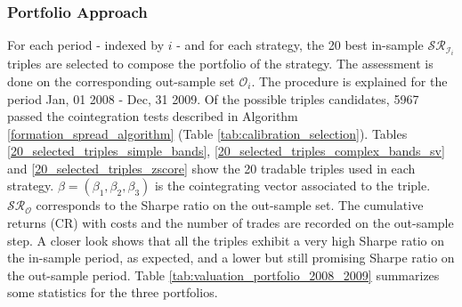 \documentclass[11pt,a4,twosided,singlespacing,titlepagenumber=on]{scrreprt}
\numberwithin{equation}{chapter} %
\theoremstyle{remark}
\begin{document}
\subsubsection{Portfolio Approach}
For each period - indexed by $i$ - and for each strategy, the 20 best in-sample $\mathcal{SR}_{\mathcal{I}_i}$ triples are selected to compose the portfolio of the strategy. The assessment is done on the corresponding out-sample set $\mathcal{O}_i$. The procedure is explained for the period Jan, 01 2008 - Dec, 31 2009. Of the possible triples candidates, 5967 passed the cointegration tests described in Algorithm \ref{formation_spread_algorithm} (Table \ref{tab:calibration_selection}). Tables \ref{20_selected_triples_simple_bands}, \ref{20_selected_triples_complex_bands_sv} and \ref{20_selected_triples_zscore} show the 20 tradable triples used in each strategy. $\beta = (\beta_1, \beta_2, \beta_3)$ is the cointegrating vector associated to the triple. $\mathcal{SR}_\mathcal{O}$ corresponds to the Sharpe ratio on the out-sample set. The cumulative returns (CR) with costs and the number of trades are recorded on the out-sample step. A closer look shows that all the triples exhibit a very high Sharpe ratio on the in-sample period, as expected, and a lower but still promising Sharpe ratio on the out-sample period. Table \ref{tab:valuation_portfolio_2008_2009} summarizes some statistics for the three portfolios.
\end{document}

